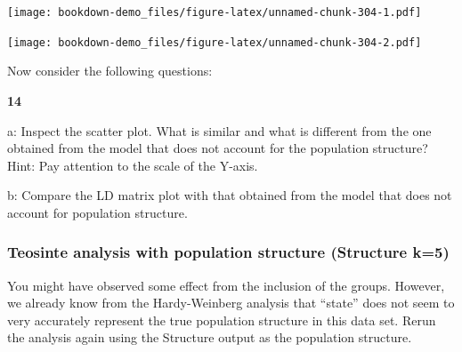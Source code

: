 \documentclass[
]{book}
\makeatletter
\newenvironment{Shaded}{\begin{snugshade}}{\end{snugshade}}
\newcommand{\AttributeTok}[1]{\textcolor[rgb]{0.77,0.63,0.00}{#1}}
\newcommand{\DecValTok}[1]{\textcolor[rgb]{0.00,0.00,0.81}{#1}}
\newcommand{\FloatTok}[1]{\textcolor[rgb]{0.00,0.00,0.81}{#1}}
\newcommand{\FunctionTok}[1]{\textcolor[rgb]{0.00,0.00,0.00}{#1}}
\newcommand{\NormalTok}[1]{#1}
\newcommand{\OtherTok}[1]{\textcolor[rgb]{0.56,0.35,0.01}{#1}}
\newcommand{\SpecialCharTok}[1]{\textcolor[rgb]{0.00,0.00,0.00}{#1}}
\newcommand{\StringTok}[1]{\textcolor[rgb]{0.31,0.60,0.02}{#1}}
\newenvironment{kframe}{%
\medskip{}
\setlength{\fboxsep}{.8em}
 \def\at@end@of@kframe{}%
 \ifinner\ifhmode%
  \def\at@end@of@kframe{\end{minipage}}%
  \begin{minipage}{\columnwidth}%
 \fi\fi%
 \def\FrameCommand##1{\hskip\@totalleftmargin \hskip-\fboxsep
 \colorbox{shadecolor}{##1}\hskip-\fboxsep
     \hskip-\linewidth \hskip-\@totalleftmargin \hskip\columnwidth}%
 \MakeFramed {\advance\hsize-\width
   \@totalleftmargin\z@ \linewidth\hsize
   \@setminipage}}%
 {\par\unskip\endMakeFramed%
 \at@end@of@kframe}
\newenvironment{rmdblock}[1]
  {
  \begin{itemize}
  \renewcommand{\labelitemi}{
    \raisebox{-.7\height}[0pt][0pt]{
      {\setkeys{Gin}{width=3em,keepaspectratio}\texttt{[image: images/\#1]}}
    }
  }
  \setlength{\fboxsep}{1em}
  \begin{kframe}
  \item
  }
  {
  \end{kframe}
  \end{itemize}
  }
\newenvironment{rmdquiz}
  {\begin{rmdblock}{quiz}}
  {\end{rmdblock}}
\makeatother
\begin{document}
\texttt{[image: bookdown-demo\_files/figure-latex/unnamed-chunk-304-1.pdf]}

\begin{Shaded}
\end{Shaded}

\texttt{[image: bookdown-demo\_files/figure-latex/unnamed-chunk-304-2.pdf]}

Now consider the following questions:

\begin{rmdquiz}
\textbf{14}

a: Inspect the scatter plot. What is similar and what is different from the one obtained from the model that does not account for the population structure? Hint: Pay attention to the scale of the Y-axis.

b: Compare the LD matrix plot with that obtained from the model that does not account for population structure.
\end{rmdquiz}

\hypertarget{teosinte-analysis-with-population-structure-structure-k5}{%
\subsubsection{Teosinte analysis with population structure (Structure k=5)}\label{teosinte-analysis-with-population-structure-structure-k5}}

You might have observed some effect from the inclusion of the groups. However, we already know from the Hardy-Weinberg analysis that ``state'' does not seem to very accurately represent the true population structure in this data set. Rerun the analysis again using the Structure output as the population structure.
\end{document}
